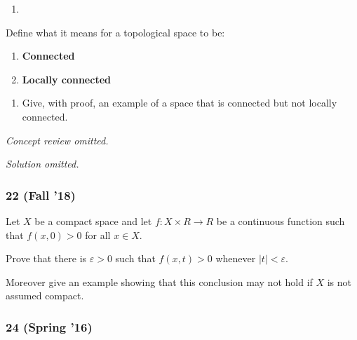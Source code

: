 \begin{problem}[?]

\begin{enumerate}
\def\labelenumi{\alph{enumi}.}
\tightlist
\item
\end{enumerate}

Define what it means for a topological space to be:

\begin{enumerate}
\def\labelenumi{\roman{enumi}.}
\item
  \textbf{Connected}
\item
  \textbf{Locally connected}
\end{enumerate}

\begin{enumerate}
\def\labelenumi{\alph{enumi}.}
\setcounter{enumi}{1}
\tightlist
\item
  Give, with proof, an example of a space that is connected but not
  locally connected.
\end{enumerate}

\end{problem}


\emph{Concept review omitted.}

\emph{Solution omitted.}

\hypertarget{fall-18}{%
\subsubsection{22 (Fall '18)}\label{fall-18}}

\begin{problem}[?]

Let \(X\) be a compact space and let \(f : X \times R \to R\) be a
continuous function such that \(f (x, 0) > 0\) for all \(x \in X\).

Prove that there is \({\varepsilon}> 0\) such that \(f (x, t) > 0\)
whenever \({\left\lvert {t} \right\rvert} < {\varepsilon}\).

Moreover give an example showing that this conclusion may not hold if
\(X\) is not assumed compact.

\end{problem}

\hypertarget{spring-16}{%
\subsubsection{24 (Spring '16)}\label{spring-16}}

